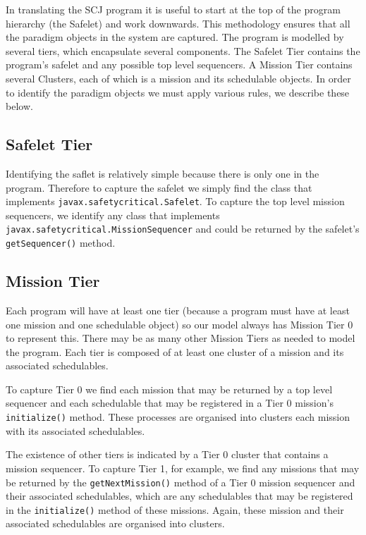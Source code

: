 In translating the SCJ program it is useful to start at the top of the program hierarchy (the Safelet) and work downwards. This methodology ensures that all the paradigm objects in the system are captured. The program is modelled by several tiers, which encapsulate several components. The Safelet Tier contains the program's safelet and any possible top level sequencers. A Mission Tier contains several Clusters, each of which is a mission and its schedulable objects. In order to identify the paradigm objects we must apply various rules, we describe these below.

\subsection{Safelet Tier}

Identifying the saflet is relatively simple because there is only one in the program. Therefore to capture the safelet we simply find the class that implements \texttt{javax.safetycritical.Safelet}. To capture the top level mission sequencers, we identify any class that implements \texttt{javax.safetycritical.MissionSequencer} and could be returned by the safelet's \texttt{getSequencer()} method. 

\subsection{Mission Tier}

Each program will have at least one tier (because a program must have at least one mission and one schedulable object) so our model always has Mission Tier 0 to represent this. There may be as many other Mission Tiers as needed to model the program. Each tier is composed of at least one cluster of a mission and its associated schedulables.

To capture Tier 0 we find each mission that may be returned by a top level sequencer and each schedulable that may be registered in a Tier 0 mission's \texttt{initialize()} method. These processes are organised into clusters each mission with its associated schedulables. 

The existence of other tiers is indicated by a Tier 0 cluster that contains a mission sequencer. To capture Tier 1, for example, we find any missions that may be returned by the \texttt{getNextMission()} method of a Tier 0 mission sequencer and their associated schedulables, which are any schedulables that may be registered in the \texttt{initialize()} method of these missions. Again, these mission and their associated schedulables are organised into clusters.  

